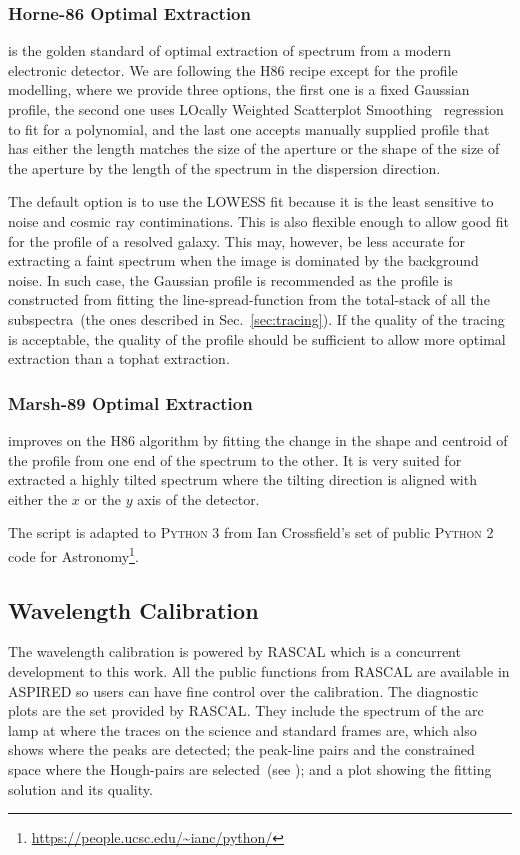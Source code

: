 \documentclass[fleqn,usenatbib]{mnras}
\begin{document}
\subsubsection*{Horne-86 Optimal Extraction}
\citet[hereafter H86]{1986PASP...98..609H} is the golden standard
of optimal extraction of spectrum from a modern electronic detector.
We are following the H86 recipe except for the profile modelling,
where we provide three options, the first one is a fixed Gaussian
profile, the second one uses LOcally Weighted Scatterplot
Smoothing~\citep[LOWESS]{doi:10.1080/01621459.1979.10481038}
regression to fit for a polynomial, and the last one accepts
manually supplied profile that has either the length matches the
size of the aperture or the shape of the size of the aperture by
the length of the spectrum in the dispersion direction.

The default option is to use the LOWESS fit because it is the
least sensitive to noise and cosmic ray contiminations. This is
also flexible enough to allow good fit for the profile of a
resolved galaxy. This may, however, be less accurate for
extracting a faint spectrum when the image is dominated by the
background noise. In such case, the Gaussian profile is
recommended as the profile is constructed from fitting the
line-spread-function from the total-stack of all the
subspectra~(the ones described in Sec.~\ref{sec:tracing}). If
the quality of the tracing is acceptable, the quality of the
profile should be sufficient to allow more optimal extraction
than a tophat extraction.

\subsubsection*{Marsh-89 Optimal Extraction}
\citet[hereafter M89]{1989PASP..101.1032M} improves on the H86
algorithm by fitting the change in the shape and centroid of
the profile from one end of the spectrum to the other. It is
very suited for extracted a highly tilted spectrum where the
tilting direction is aligned with either the $x$ or the $y$
axis of the detector.

The script is adapted to \textsc{Python 3} from Ian Crossfield's
set of public \textsc{Python 2} code for 
Astronomy\footnote{\url{https://people.ucsc.edu/~ianc/python/}}.

\subsection{Wavelength Calibration}
The wavelength calibration is powered by \textsc{RASCAL} which
is a concurrent development to this work. All the public
functions from \textsc{RASCAL} are available in \textsc{ASPIRED}
so users can have fine control over the calibration. The
diagnostic plots are the set provided by \textsc{RASCAL}.
They include the spectrum of the arc lamp at where the traces
on the science and standard frames are, which also shows where
the peaks are detected; the peak-line pairs and the constrained
space where the Hough-pairs are
selected~(see \citealt{2020ASPC..527..627V}); and a plot showing
the fitting solution and its quality.
\end{document}
